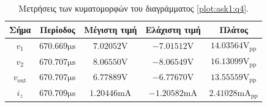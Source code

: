 \begin{table}[h]
	\begin{center}
		\begin{tabular}{|c|c|c|c|c|}
			\hline
			\textbf{Σήμα}      & \textbf{Περίοδος}             & \textbf{Μέγιστη τιμή}         & \textbf{Ελάχιστη τιμή}         & \textbf{Πλάτος}                       \\
			\hline
			\hline
			$v_1$              & $670.669\unit{\micro\second}$ & $7.02052\unit{\volt}$         & $-7.01512\unit{\volt}$         & $14.03564\unit{\volt}_{\mathrm{pp}}$         \\\hline
			$v_2$              & $670.707\unit{\micro\second}$ & $8.06550\unit{\volt}$         & $-8.06549\unit{\volt}$         & $16.13099\unit{\volt}_{\mathrm{pp}}$         \\\hline
			$v_{\mathrm{out}}$ & $670.707\unit{\micro\second}$ & $6.77889\unit{\volt}$         & $-6.77670\unit{\volt}$         & $13.55559\unit{\volt}_{\mathrm{pp}}$         \\\hline
			$i_z$              & $670.709\unit{\micro\second}$ & $1.20446\unit{\milli\ampere}$ & $-1.20582\unit{\milli\ampere}$ & $2.41028\unit{\milli\ampere}_{\mathrm{pp}}$ \\\hline
		\end{tabular}
		\caption{Μετρήσεις των κυματομορφών του διαγράμματος \ref{plot:ask1:q4}.}
		\label{table:ask1:q4:periods}
	\end{center}
\end{table}
